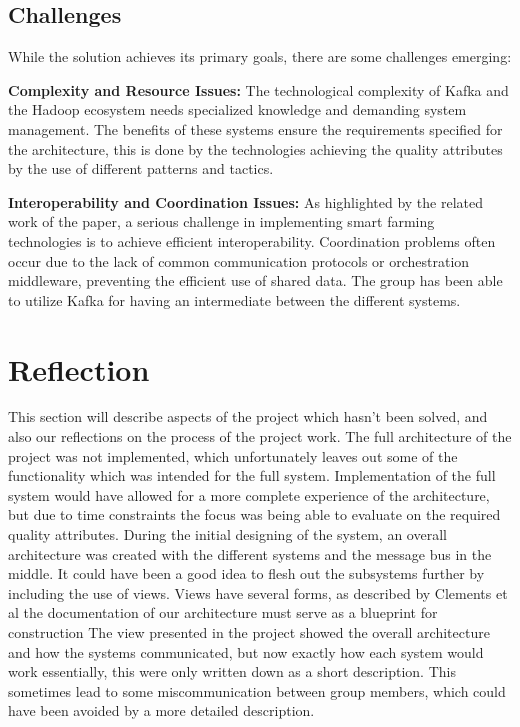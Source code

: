 \documentclass[conference]{IEEEtran}
\begin{document}
\subsection{Challenges}
While the solution achieves its primary goals, there are some challenges emerging:

\textbf{Complexity and Resource Issues:} The technological complexity of Kafka and the Hadoop ecosystem needs specialized knowledge and demanding system management. The benefits of these systems ensure the requirements specified for the architecture, this is done by the technologies achieving the quality attributes by the use of different patterns and tactics.

\textbf{Interoperability and Coordination Issues:} As highlighted by the related work of the paper, a serious challenge in implementing smart farming technologies is to achieve efficient interoperability. Coordination problems often occur due to the lack of common communication protocols or orchestration middleware, preventing the efficient use of shared data. The group has been able to utilize Kafka for having an intermediate between the different systems.

\section{Reflection}

This section will describe aspects of the project which hasn't been solved, and also our reflections on the process of the project work. \newline
The full architecture of the project was not implemented, which unfortunately leaves out some of the functionality which was intended for the full system. Implementation of the full system would have allowed for a more complete experience of the architecture, but due to time constraints the focus was being able to evaluate on the required quality attributes.
During the initial designing of the system, an overall architecture was created with the different systems and the message bus in the middle. It could have been a good idea to flesh out the subsystems further by including the use of views. Views have several forms, as described by Clements et al the documentation of our architecture must serve as a blueprint for construction %
The view presented in the project showed the overall architecture and how the systems communicated, but now exactly how each system would work essentially, this were only written down as a short description. This sometimes lead to some miscommunication between group members, which could have been avoided by a more detailed description. \newline
\end{document}
